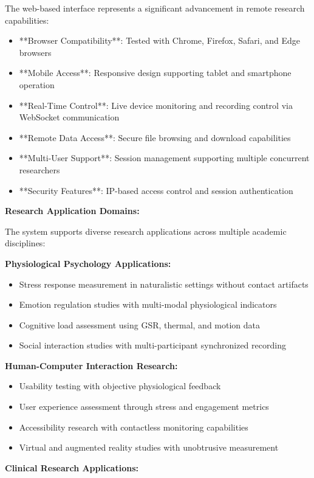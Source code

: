 \documentclass[12pt,a4paper]{article}
\begin{document}
The web-based interface represents a significant advancement in remote research capabilities:

\begin{itemize}
\item **Browser Compatibility**: Tested with Chrome, Firefox, Safari, and Edge browsers
\item **Mobile Access**: Responsive design supporting tablet and smartphone operation
\item **Real-Time Control**: Live device monitoring and recording control via WebSocket communication
\item **Remote Data Access**: Secure file browsing and download capabilities
\item **Multi-User Support**: Session management supporting multiple concurrent researchers
\item **Security Features**: IP-based access control and session authentication

\end{itemize}
\textbf{Research Application Domains:}

The system supports diverse research applications across multiple academic disciplines:

\textbf{Physiological Psychology Applications:}

\begin{itemize}
\item Stress response measurement in naturalistic settings without contact artifacts
\item Emotion regulation studies with multi-modal physiological indicators
\item Cognitive load assessment using GSR, thermal, and motion data
\item Social interaction studies with multi-participant synchronized recording

\end{itemize}
\textbf{Human-Computer Interaction Research:}

\begin{itemize}
\item Usability testing with objective physiological feedback
\item User experience assessment through stress and engagement metrics
\item Accessibility research with contactless monitoring capabilities
\item Virtual and augmented reality studies with unobtrusive measurement

\end{itemize}
\textbf{Clinical Research Applications:}
\end{document}
